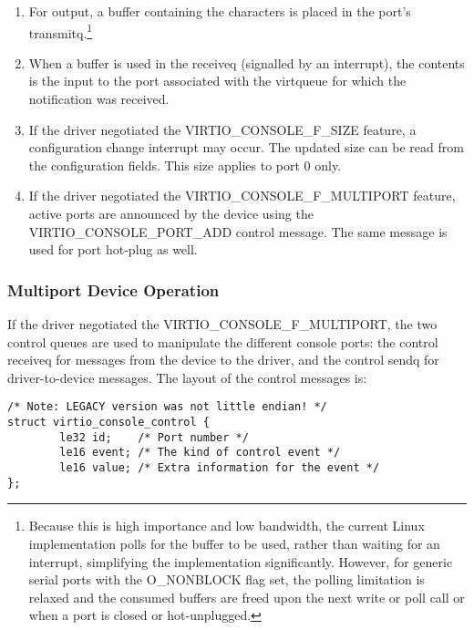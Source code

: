 \begin{enumerate}
\item For output, a buffer containing the characters is placed in
  the port's transmitq.\footnote{Because this is high importance and low bandwidth, the current
Linux implementation polls for the buffer to be used, rather than
waiting for an interrupt, simplifying the implementation
significantly. However, for generic serial ports with the
O_NONBLOCK flag set, the polling limitation is relaxed and the
consumed buffers are freed upon the next write or poll call or
when a port is closed or hot-unplugged.
}

\item When a buffer is used in the receiveq (signalled by an
  interrupt), the contents is the input to the port associated
  with the virtqueue for which the notification was received.

\item If the driver negotiated the VIRTIO_CONSOLE_F_SIZE feature, a
  configuration change interrupt may occur. The updated size can
  be read from the configuration fields.  This size applies to port 0 only.

\item If the driver negotiated the VIRTIO_CONSOLE_F_MULTIPORT
  feature, active ports are announced by the device using the
  VIRTIO_CONSOLE_PORT_ADD control message. The same message is
  used for port hot-plug as well.
\end{enumerate}

\subsubsection{Multiport Device Operation}\label{sec:Device Types / Console Device / Device Operation / Multiport Device Operation}

If the driver negotiated the VIRTIO_CONSOLE_F_MULTIPORT, the two
control queues are used to manipulate the different console ports: the
control receiveq for messages from the device to the driver, and the
control sendq for driver-to-device messages.  The layout of the
control messages is:

\begin{lstlisting}
/* Note: LEGACY version was not little endian! */
struct virtio_console_control {
        le32 id;    /* Port number */
        le16 event; /* The kind of control event */
        le16 value; /* Extra information for the event */
};
\end{lstlisting}

